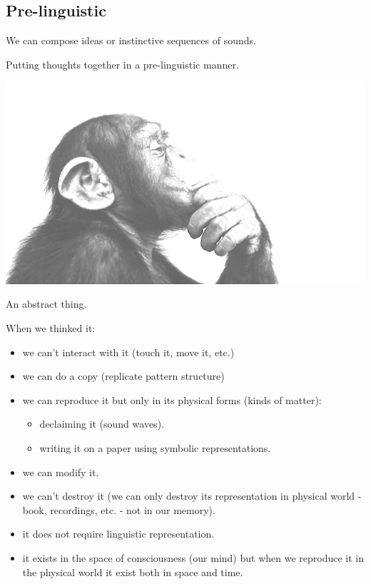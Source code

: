 \subsection{Pre-linguistic}\label{pre-linguistic}

We can compose ideas or instinctive sequences of sounds.

Putting thoughts together in a pre-linguistic manner.

\begin{center}
\includegraphics[scale=0.5]{../img/pensiero.png}
\end{center}

An abstract thing.

When we thinked it:

\begin{itemize}
\tightlist
\item we can't interact with it (touch it, move it, etc.)
\item we can do a copy (replicate pattern structure)
\item we can reproduce it but only in its physical forms (kinds of matter):
   \begin{itemize}
   \tightlist
   \item declaiming it (sound waves).
   \item writing it on a paper using symbolic representations.
   \end{itemize}
\item we can modify it.
\item we can't destroy it (we can only destroy its representation in physical world - book, recordings, etc. - not in our memory).
\item it does not require linguistic representation.
\item it exists in the space of consciousness (our mind) but when we
  reproduce it in the physical world it exist both in space and time.
\end{itemize}

